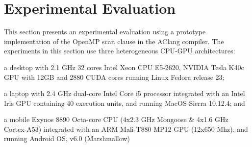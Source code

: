 \documentclass[Ingles]{ic-tese-v1}
\begin{document}
\chapter{Experimental Evaluation}
\label{cap:Experiments}

This  section presents  an experimental  evaluation using  a prototype
implementation of  the OpenMP scan  clause in the AClang compiler.
The  experiments in this section  use  three   heterogeneous  CPU-GPU
architectures:

\begin{inparaenum}[(i)\upshape]
	\item a desktop with 2.1 GHz 32 cores Intel Xeon CPU E5-2620,
	NVIDIA Tesla K40c GPU with 12GB and 2880 CUDA cores  running
	Linux Fedora  release 23;
	\item  a  laptop  with  2.4  GHz dual-core  Intel  Core  i5  processor
	integrated with an Intel Iris GPU containing 40 execution units, and
	running MacOS Sierra 10.12.4; and
	\item a mobile  Exynos 8890 Octa-core  CPU (4x2.3 GHz Mongoose  \& 4x1.6
	GHz Cortex-A53)  integrated with an  ARM Mali-T880 MP12  GPU (12x650
	Mhz), and running Android OS, v6.0 (Marshmallow)
\end{inparaenum}
\end{document}
